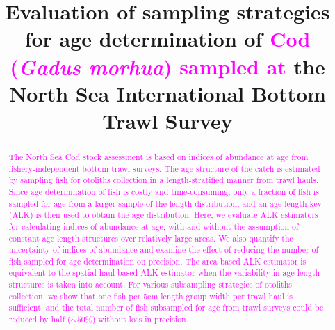 \documentclass[a4paper 12pt]{article}
\title{\bf 
}
\author{}
\date{}
\numberwithin{equation}{section}
\newcommand{\natty}[1]{\textcolor{magenta}{#1}}
\begin{document}

\title{Evaluation of sampling strategies for age determination of \natty{Cod (\textit{Gadus morhua}) sampled at} the  North Sea International Bottom Trawl Survey }
\maketitle


\begin{abstract}

\natty{The North Sea Cod stock assessment is based on indices of abundance at age from fishery-independent bottom trawl surveys. The age structure of the catch is estimated by sampling fish for otoliths collection in a length-stratified manner from trawl hauls. Since age determination of fish is costly and time-consuming, only a fraction of fish is sampled for age from a larger sample of the length distribution, and an age-length key (ALK) is then used to obtain the age distribution. Here, we evaluate ALK estimators for calculating indices of abundance at age, with and without the assumption of constant age length structures over relatively large areas. We also quantify the uncertainty of indices of  abundance and examine the effect of reducing the number of fish sampled for age determination on precision.  The area based ALK estimator is equivalent to the spatial haul based ALK estimator when the variability in age-length structures is taken into account. For various subsampling strategies of otoliths collection, we show that  one fish per 5cm length group width per trawl haul is sufficient, and the total number of fish subsampled for age from trawl surveys could be reduced by half ($\sim 50\%$) without loss in precision.}

\end{abstract}

\end{document}
